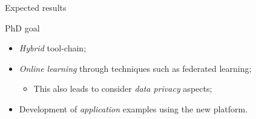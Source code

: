 \documentclass[presentation]{beamer}\mode<presentation>{\usetheme{AMSBolognaFC}}
\begin{document}

	


\begin{frame}[c]{Expected results}


\begin{block}{PhD goal}
	\begin{itemize}
		\item \emph{Hybrid} tool-chain;
		\item \emph{Online learning} through techniques such as federated learning;
		\begin{itemize}
			\item This also leads to consider \emph{data privacy} aspects;
		\end{itemize}
		\item Development of \emph{application} examples using the new platform.
	\end{itemize}
\end{block}


\end{frame}
\end{document}
